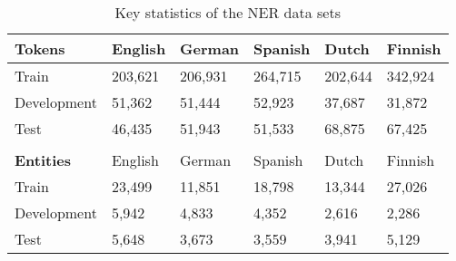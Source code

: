 \begin{table}[!t]
\centering
\begin{tabular}{l|lllll}
\textbf{Tokens}   & English &  German & Spanish & Dutch   & Finnish \\ \hline
Train             & 203,621 & 206,931 & 264,715 & 202,644 & 342,924 \\ %
Development       &  51,362 &  51,444 &  52,923 &  37,687 &  31,872 \\ %
Test              &  46,435 &  51,943 &  51,533 &  68,875 &  67,425 \\ %
\multicolumn{6}{c}{} \\
\textbf{Entities} & English &  German & Spanish & Dutch   & Finnish \\ \hline
Train             &  23,499 &  11,851 &  18,798 &  13,344 &  27,026 \\ %
Development       &   5,942 &   4,833 &   4,352 &   2,616 &   2,286 \\ %
Test              &   5,648 &   3,673 &   3,559 &   3,941 &   5,129 \\ %
\end{tabular}
\caption{Key statistics of the NER data sets}
\label{ner-data}
\end{table}

